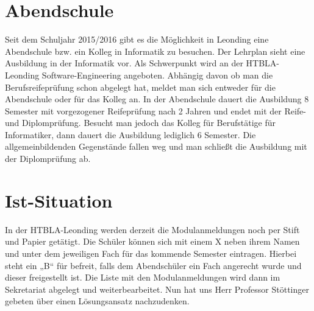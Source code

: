 \section{Abendschule}

Seit dem Schuljahr 2015/2016 gibt es die Möglichkeit in Leonding eine Abendschule bzw. ein Kolleg in Informatik zu besuchen.
Der Lehrplan sieht eine Ausbildung in der Informatik vor. 
Als Schwerpunkt wird an der HTBLA-Leonding Software-Engineering angeboten. 
Abhängig davon ob man die Berufsreifeprüfung schon abgelegt hat, meldet man sich entweder für die Abendschule oder für das Kolleg an. 
In der Abendschule dauert die Ausbildung 8 Semester mit vorgezogener Reifeprüfung nach 2 Jahren und endet mit der Reife- und Diplomprüfung.
Besucht man jedoch das Kolleg für Berufstätige für Informatiker, dann dauert die Ausbildung lediglich 6 Semester. 
Die allgemeinbildenden Gegenstände fallen weg und man schließt die Ausbildung mit der Diplomprüfung ab.




\section{Ist-Situation}

In der HTBLA-Leonding werden derzeit die Modulanmeldungen noch per Stift und Papier getätigt. 
Die Schüler können sich mit einem X neben ihrem Namen und unter dem jeweiligen Fach für das kommende Semester eintragen. 
Hierbei steht ein „B“ für befreit, falls dem Abendschüler ein Fach angerecht wurde und dieser freigestellt ist. 
Die Liste mit den Modulanmeldungen wird dann im Sekretariat abgelegt und weiterbearbeitet. 
Nun hat uns Herr Professor Stöttinger gebeten über einen Lösungsansatz nachzudenken. 

